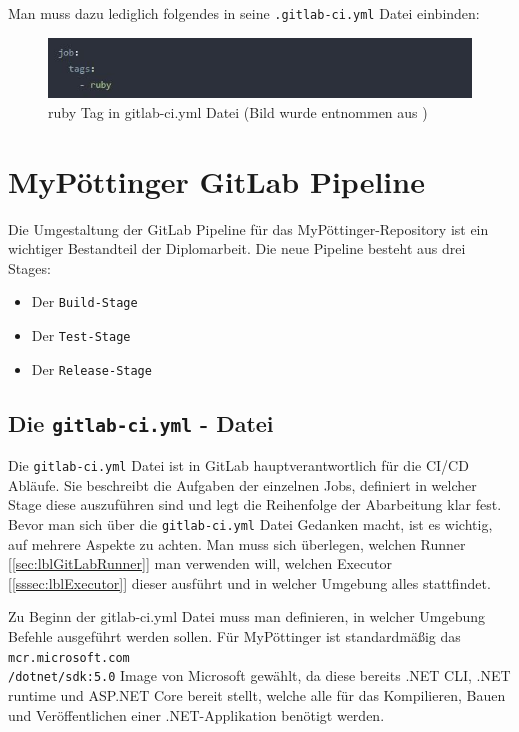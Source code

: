 Man muss dazu lediglich folgendes in seine  \colorbox{MyLightGrayBackgroundForCode}{\texttt{.gitlab-ci.yml}} Datei einbinden:

\begin{figure}[h]
	\centerline{
		\includegraphics{./grafiken/ruby_runner_tag_in_gitlab-ci-yml_file.JPG}
	}
	\vskip0pt
	\caption{ruby Tag in gitlab-ci.yml Datei (Bild wurde entnommen aus \autocite{gitlabRunner})}
\end{figure}

\newpage

\section{MyPöttinger GitLab Pipeline}

Die Umgestaltung der GitLab Pipeline für das MyPöttinger-Repository ist ein wichtiger Bestandteil der Diplomarbeit. Die neue Pipeline besteht aus drei Stages:

\begin{itemize}
	\item Der \colorbox{MyLightGrayBackgroundForCode}{\texttt{Build-Stage}}
	\item Der \colorbox{MyLightGrayBackgroundForCode}{\texttt{Test-Stage}}
	\item Der \colorbox{MyLightGrayBackgroundForCode}{\texttt{Release-Stage}}
\end{itemize}

\subsection{Die {\texttt{gitlab-ci.yml}} - Datei }

Die \texttt{gitlab-ci.yml} Datei ist in GitLab hauptverantwortlich für die CI/CD Abläufe. Sie beschreibt die Aufgaben der einzelnen Jobs, definiert in welcher Stage diese auszuführen sind und legt die Reihenfolge der Abarbeitung klar fest. Bevor man sich über die \texttt{gitlab-ci.yml} Datei Gedanken macht, ist es wichtig, auf mehrere Aspekte zu achten. Man muss sich überlegen, welchen Runner [\ref{sec:lblGitLabRunner}] man verwenden will, welchen Executor [\ref{sssec:lblExecutor}] dieser ausführt und in welcher Umgebung alles stattfindet.

Zu Beginn der gitlab-ci.yml Datei muss man definieren, in welcher Umgebung Befehle ausgeführt werden sollen. Für MyPöttinger ist standardmäßig das \texttt{mcr.microsoft.com\\/dotnet/sdk:5.0} Image von Microsoft gewählt, da diese bereits .NET CLI, .NET runtime und ASP.NET Core bereit stellt, welche alle für das Kompilieren, Bauen und Veröffentlichen einer .NET-Applikation benötigt werden.

